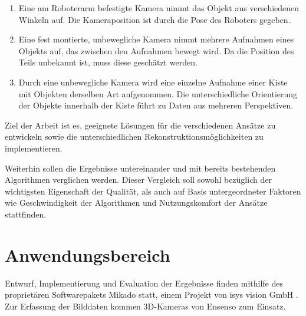 \begin{enumerate}
\item Eine am Roboterarm befestigte Kamera nimmt das Objekt aus verschiedenen Winkeln auf.
Die Kameraposition ist durch die Pose des Roboters gegeben.
\item Eine fest montierte, unbewegliche Kamera nimmt mehrere Aufnahmen eines Objekts auf, das zwischen den Aufnahmen bewegt wird.
Da die Position des Teils unbekannt ist, muss diese geschätzt werden.
\item Durch eine unbewegliche Kamera wird eine einzelne Aufnahme einer Kiste mit Objekten derselben Art aufgenommen.
Die unterschiedliche Orientierung der Objekte innerhalb der Kiste führt zu Daten aus mehreren Perspektiven.
\end{enumerate}

Ziel der Arbeit ist es, geeignete Lösungen für die verschiedenen Ansätze zu entwickeln sowie die unterschiedlichen Rekonstruktionsmöglichkeiten zu implementieren.

Weiterhin sollen die Ergebnisse untereinander und mit bereits bestehenden Algorithmen verglichen werden.
Dieser Vergleich soll sowohl bezüglich der wichtigsten Eigenschaft der Qualität, als auch auf Basis untergeordneter Faktoren wie Geschwindigkeit der Algorithmen und Nutzungskomfort der Ansätze stattfinden.



\section{Anwendungsbereich}
\label{sec:anwendungsbereich}

Entwurf, Implementierung und Evaluation der Ergebnisse finden mithilfe des proprietären Softwarepakets Mikado \cite{mikadoWebsite} statt, einem Projekt von isys vision GmbH \cite{isysWebsite}.
Zur Erfassung der Bilddaten kommen 3D-Kameras von Ensenso \cite{ensensoWebsite} zum Einsatz.
